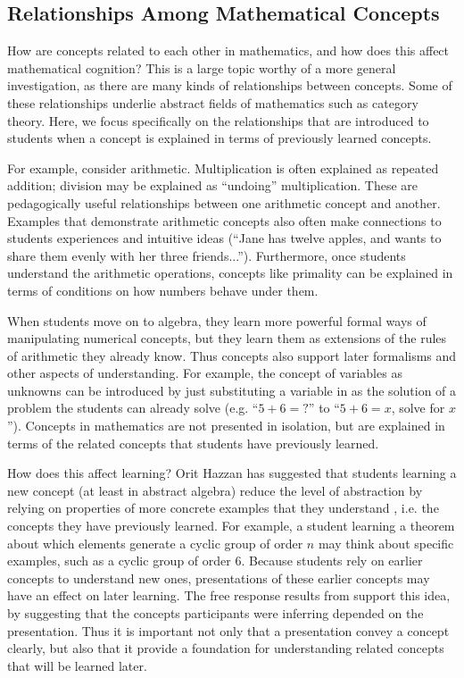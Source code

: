 \documentclass[man,mask,10pt]{apa6}
\begin{document}
\subsection{Relationships Among Mathematical Concepts}
How are concepts related to each other in mathematics, and how does this affect mathematical cognition? This is a large topic worthy of a more general investigation, as there are many kinds of relationships between concepts. Some of these relationships underlie abstract fields of mathematics such as category theory. Here, we focus specifically on the relationships that are introduced to students when a concept is explained in terms of previously learned concepts. \par
For example, consider arithmetic. Multiplication is often explained as repeated addition; division may be explained as ``undoing'' multiplication. These are pedagogically useful relationships between one arithmetic concept and another. Examples that demonstrate arithmetic concepts also often make connections to students experiences and intuitive ideas (``Jane has twelve apples, and wants to share them evenly with her three friends...''). Furthermore, once students understand the arithmetic operations, concepts like primality can be explained in terms of conditions on how numbers behave under them. \par
When students move on to algebra, they learn more powerful formal ways of manipulating numerical concepts, but they learn them as extensions of the rules of arithmetic they already know. Thus concepts also support later formalisms and other aspects of understanding. For example, the concept of variables as unknowns can be introduced by just substituting a variable in as the solution of a problem the students can already solve (e.g. ``$5+6=?$'' to ``$5+6=x$, solve for $x$''). Concepts in mathematics are not presented in isolation, but are explained in terms of the related concepts that students have previously learned. \par 
How does this affect learning? Orit Hazzan has suggested that students learning a new concept (at least in abstract algebra) reduce the level of abstraction by relying on properties of more concrete examples that they understand \cite{Hazzan1999}, i.e. the concepts they have previously learned. For example, a student learning a theorem about which elements generate a cyclic group of order $n$ may think about specific examples, such as a cyclic group of order 6. Because students rely on earlier concepts to understand new ones, presentations of these earlier concepts may have an effect on later learning. The free response results from  support this idea, by suggesting that the concepts participants were inferring depended on the presentation. Thus it is important not only that a presentation convey a concept clearly, but also that it provide a foundation for understanding related concepts that will be learned later. \par
\end{document}
